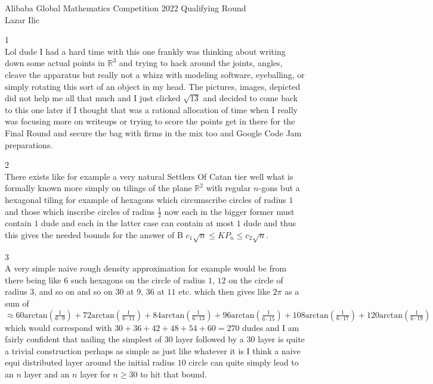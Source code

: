\Large
Alibaba Global Mathematics Competition 2022 Qualifying Round \\
Lazar Ilic

1 \\
Lol dude I had a hard time with this one frankly was thinking about writing down some actual points in $\mathbb{R}^3$ and trying to hack around the joints, angles, cleave the apparatus but really not a whizz with modeling software, eyeballing, or simply rotating this sort of an object in my head. The pictures, images, depicted did not help me all that much and I just clicked $\sqrt{13}$ and decided to come back to this one later if I thought that was a rational allocation of time when I really was focusing more on writeups or trying to score the points get in there for the Final Round and secure the bag with firms in the mix too and Google Code Jam preparations.

2 \\
There exists like for example a very natural Settlers Of Catan tier well what is formally known more simply on tilings of the plane $\mathbb{R}^2$ with regular $n$-gons but a hexagonal tiling for example of hexagons which circumscribe circles of radius $1$ and those which inscribe circles of radius $\frac{1}{2}$ now each in the bigger former must contain $1$ dude and each in the latter case can contain at most $1$ dude and thus this gives the needed bounds for the answer of B $c_1 \sqrt{n} \le KP_n \le c_2 \sqrt{n}$.

3 \\
A very simple naive rough density approximation for example would be from there being like $6$ such hexagons on the circle of radius $1$, $12$ on the circle of radius $3$, and so on and so on $30$ at $9$, $36$ at $11$ etc. which then gives like $2 \pi$ as a sum of $\approx 60 \text{arctan} \left( \frac{1}{6 \cdot 9} \right) + 72 \text{arctan} \left( \frac{1}{6 \cdot 11} \right) + 84 \text{arctan} \left( \frac{1}{6 \cdot 13} \right) + 96 \text{arctan} \left( \frac{1}{6 \cdot 15} \right) + 108 \text{arctan} \left( \frac{1}{6 \cdot 17} \right) + 120 \text{arctan} \left( \frac{1}{6 \cdot 19} \right)$ which would correspond with $30+36+42+48+54+60 = 270$ dudes and I am fairly confident that nailing the simplest of $30$ layer followed by a $30$ layer is quite a trivial construction perhaps as simple as just like whatever it is I think a naive equi distributed layer around the initial radius $10$ circle can quite simply lead to an $n$ layer and an $n$ layer for $n \ge 30$ to hit that bound.

